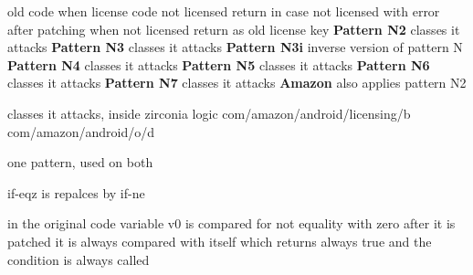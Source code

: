 
old code when license code not licensed return in case not licensed with error
after patching when not licensed return as old license key
\newline
\newline
\textbf{Pattern N2}\newline
classes it attacks
\newline
\newline
\textbf{Pattern N3}\newline
classes it attacks
\newline
\newline
\textbf{Pattern N3i}\newline
inverse version of pattern N
\newline
\newline
\textbf{Pattern N4}\newline
classes it attacks
\newline
\newline
\textbf{Pattern N5}\newline
classes it attacks
\newline
\newline
\textbf{Pattern N6}\newline
classes it attacks
\newline
\newline
\textbf{Pattern N7}\newline
classes it attacks
\newline
\newline
\textbf{Amazon}\newline
also applies pattern N2

classes it attacks, inside zirconia logic
com/amazon/android/licensing/b
com/amazon/android/o/d

one pattern, used on both



if-eqz is repalces by if-ne


in the original code variable v0 is compared for not equality with zero
after it is patched it is always compared with itself which returns always true and the condition is always called

